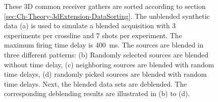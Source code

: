 \begin{figure}
	\caption{These 3D common receiver gathers are sorted according to section \ref{sec:Ch-Theory-3dExtension-DataSorting}. The unblended synthetic data (a) is used to simulate a blended acquisition with 3 experiments per crossline and 7 shots per experiment. The maximum firing time delay is \SI{400}{\milli\second}. The sources are blended in three different patterns: (b) Randomly selected sources are blended without time delay, (c) neighboring sources are blended with random time delays, (d) randomly picked sources are blended with random time delays. Next, the blended data sets are deblended. The corresponding deblending results are illustrated in (b) to (d).}
	\label{fig:Ch-Results-Debl-Delphi}
	
\end{figure}



